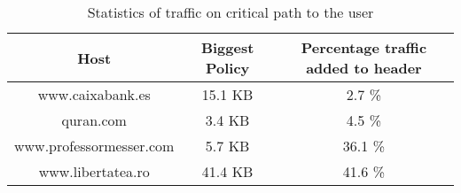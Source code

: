 \begin{table}[h]
\begin{center}
\begin{tabular}{| c c c |}
	\hline
	Host & Biggest Policy & Percentage traffic added to header \\ \hline
	www.caixabank.es        & 15.1 KB &   2.7 \% \\ \hline 
	quran.com               &  3.4 KB &   4.5 \% \\ \hline 
	www.professormesser.com &  5.7 KB &  36.1 \% \\ \hline 
	www.libertatea.ro       & 41.4 KB &  41.6 \% \\ \hline 
\end{tabular}
\end{center}
	\caption{Statistics of traffic on critical path to the user}
\label{tab:optimistic}
\end{table}



%


